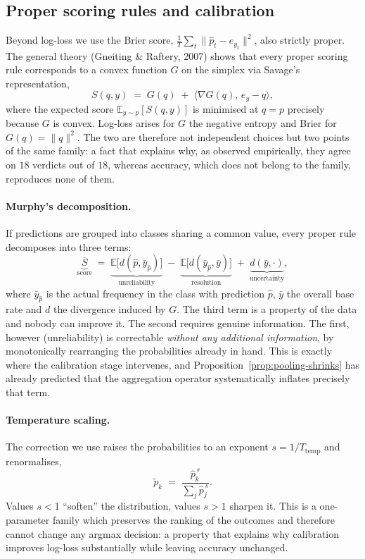 \documentclass[12pt,a4paper,oneside]{report}
\renewcommand{\_}{\oldunderscore\allowbreak}
\theoremstyle{definition}
\theoremstyle{plain}
\theoremstyle{remark}
\begin{document}
\subsection{Proper scoring rules and calibration}
\label{sec:calib-theory}

Beyond log-loss we use the Brier score, $\frac{1}{T}\sum_t \|\hat{p}_t - e_{y_t}\|^2$, also
strictly proper. The general theory (Gneiting \& Raftery, 2007) shows that every proper scoring
rule corresponds to a convex function $G$ on the simplex via Savage's representation,
\[
S(q,y) \;=\; G(q) \;+\; \langle \nabla G(q),\, e_y - q\rangle,
\]
where the expected score $\mathbb{E}_{y\sim p}[S(q,y)]$ is minimised at $q=p$ precisely because
$G$ is convex. Log-loss arises for $G$ the negative entropy and Brier for $G(q)=\|q\|^2$. The two
are therefore not independent choices but two points of the same family: a fact that explains
why, as observed empirically, they agree on $18$ verdicts out of $18$, whereas accuracy, which
does not belong to the family, reproduces none of them.

\paragraph{Murphy's decomposition.} If predictions are grouped into classes sharing a common
value, every proper rule decomposes into three terms:
\[
\underbrace{\overline{S}}_{\text{score}} \;=\;
\underbrace{\mathbb{E}\big[ d(\hat{p}, \bar{y}_{\hat{p}}) \big]}_{\text{unreliability}}
\;-\; \underbrace{\mathbb{E}\big[ d(\bar{y}_{\hat{p}}, \bar{y}) \big]}_{\text{resolution}}
\;+\; \underbrace{d(\bar{y}, \cdot)}_{\text{uncertainty}},
\]
where $\bar{y}_{\hat{p}}$ is the actual frequency in the class with prediction $\hat{p}$,
$\bar{y}$ the overall base rate and $d$ the divergence induced by $G$. The third term is a
property of the data and nobody can improve it. The second requires genuine information. The
first, however (unreliability) is correctable \emph{without any additional information}, by
monotonically rearranging the probabilities already in hand. This is exactly where the
calibration stage intervenes, and Proposition~\ref{prop:pooling-shrinks} has already predicted
that the aggregation operator systematically inflates precisely that term.

\paragraph{Temperature scaling.} The correction we use raises the probabilities to an exponent
$s = 1/T_{\text{temp}}$ and renormalises,
\[
\tilde{p}_k \;=\; \frac{\hat{p}_k^{\,s}}{\sum_{j} \hat{p}_j^{\,s}}.
\]
Values $s<1$ ``soften'' the distribution, values $s>1$ sharpen it. This is a one-parameter
family which preserves the ranking of the outcomes and therefore cannot change any argmax
decision: a property that explains why calibration improves log-loss substantially while
leaving accuracy unchanged.
\end{document}
